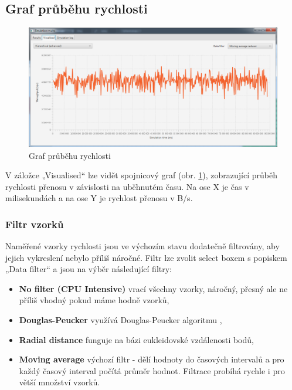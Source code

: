 \documentclass[czech,DP]{thesiskiv}
\begin{document}
\subsection{Graf průběhu rychlosti}

\begin{figure}
\centering
	\includegraphics[width=\textwidth]{img/prirucka/simulace_graf.png}
\caption{Graf průběhu rychlosti}
\label{fig:p_simulace_graf}
\end{figure}

V záložce „Visualised“ lze vidět spojnicový graf (obr. \ref{fig:p_simulace_graf}), zobrazující průběh rychlosti přenosu v závislosti na uběhnutém času. Na ose X je čas v milisekundách a na ose Y je rychlost přenosu v B/s. 

\subsubsection*{Filtr vzorků}

Naměřené vzorky rychlosti jsou ve výchozím stavu dodatečně filtrovány, aby jejich vykreslení nebylo příliš náročné. Filtr lze zvolit select boxem s popiskem „Data filter“ a jsou na výběr následující filtry:

\begin{itemize}
\item \textbf{No filter (CPU Intensive)} vrací všechny vzorky, náročný, přesný ale ne příliš vhodný pokud máme hodně vzorků,
\item \textbf{Douglas-Peucker} využívá Douglas-Peucker algoritmu \cite{douglaspeuckeralg},
\item \textbf{Radial distance} funguje na bázi eukleidovské vzdálenosti bodů,
\item \textbf{Moving average} výchozí filtr - dělí hodnoty do časových intervalů a pro každý časový interval počítá průměr hodnot. Filtrace probíhá rychle i pro větší množství vzorků.
\end{itemize}
\end{document}
